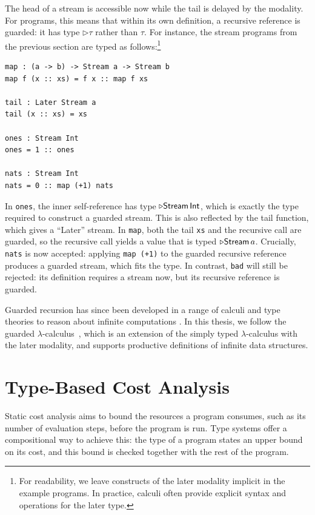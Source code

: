 The head of a stream is accessible now while the tail is delayed by the modality.
For programs, this means that within its own definition, a recursive
reference is guarded: it has type $\triangleright\tau$ rather
than $\tau$. For instance, the stream programs from the previous section
are typed as follows:\footnote{For readability, we leave constructs of the later modality implicit in the example programs. In practice, calculi often provide explicit syntax and operations
for the later type.}

\begin{lstlisting}[style=hs]
map : (a -> b) -> Stream a -> Stream b
map f (x :: xs) = f x :: map f xs

tail : Later Stream a 
tail (x :: xs) = xs

ones : Stream Int
ones = 1 :: ones

nats : Stream Int
nats = 0 :: map (+1) nats

\end{lstlisting}

\noindent
In \texttt{ones}, the inner self-reference has type
$\triangleright\mathsf{Stream}\,\mathsf{Int}$, which is exactly the type required to construct a guarded stream.
This is also reflected by the tail function, which gives a ``Later'' stream.
In \texttt{map}, both the tail \texttt{xs} and the recursive call
are guarded, so the recursive call yields a value that is typed $\triangleright\mathsf{Stream}\,a$. Crucially,
\texttt{nats} is now accepted: applying \texttt{map (+1)} to the guarded
recursive reference produces a guarded stream, which fits the type. In contrast,
\texttt{bad} will still be rejected: its definition requires a stream now, but its
recursive reference is guarded.

Guarded recursion has since been developed in a range of calculi and type
theories to reason about infinite computations \citep{atkeyProductiveCoprogrammingGuarded2013a, mogelberg14,bahrClocksAreTicking2017}.
In this thesis, we follow the guarded $\lambda$-calculus~\citep{cloustonGuardedLambdaCalculusProgramming2017a}, 
which is an extension of the simply typed $\lambda$-calculus with the later modality, and supports productive definitions of infinite data structures.

\section{Type-Based Cost Analysis}
\label{sec:bg-cost}
Static cost analysis aims to bound the resources a program consumes, such
as its number of evaluation steps, before the program is run. Type systems offer a
compositional way to achieve this: the type of a program states an upper bound on
its cost, and this bound is checked together with the rest of the program.

